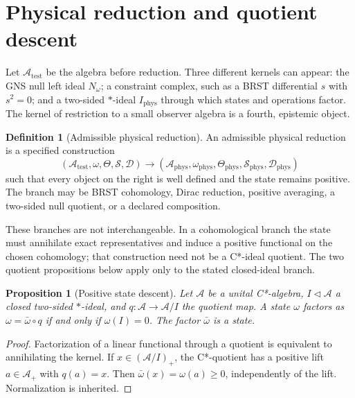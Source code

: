 \documentclass[11pt,a4paper]{article}
\newtheorem{proposition}[theorem]{Proposition}
\theoremstyle{definition}
\newtheorem{definition}[theorem]{Definition}
\theoremstyle{remark}
\newcommand{\A}{\mathcal A}
\newcommand{\Iphys}{I_{\mathrm{phys}}}
\newcommand{\Nw}{N_{\omega}}
\begin{document}
\section{Physical reduction and quotient descent}

Let $\A_{\mathrm{test}}$ be the algebra before reduction.  Three different
kernels can appear: the GNS null left ideal $\Nw$; a constraint complex, such
as a BRST differential $s$ with $s^2=0$; and a two-sided $*$-ideal $\Iphys$
through which states and operations factor.  The kernel of restriction to a
small observer algebra is a fourth, epistemic object.

\begin{definition}[Admissible physical reduction]
An admissible physical reduction is a specified construction
\begin{equation}
   (\A_{\mathrm{test}},\omega,\Theta,\mathcal S,\mathcal D)
   \longrightarrow
   (\A_{\mathrm{phys}},\omega_{\mathrm{phys}},
     \Theta_{\mathrm{phys}},\mathcal S_{\mathrm{phys}},
     \mathcal D_{\mathrm{phys}})
   \label{eq:physical-reduction}
\end{equation}
such that every object on the right is well defined and the state remains
positive.  The branch may be BRST cohomology, Dirac reduction, positive
averaging, a two-sided null quotient, or a declared composition.
\end{definition}

These branches are not interchangeable.  In a cohomological branch the state
must annihilate exact representatives and induce a positive functional on the
chosen cohomology; that construction need not be a C*-ideal quotient.  The two
quotient propositions below apply only to the stated closed-ideal branch.

\begin{proposition}[Positive state descent]
Let $\A$ be a unital C*-algebra, $I\triangleleft\A$ a closed two-sided
$*$-ideal, and $q:\A\to\A/I$ the quotient map.  A state $\omega$ factors as
$\omega=\bar\omega\circ q$ if and only if $\omega(I)=0$.  The factor
$\bar\omega$ is a state.
\end{proposition}

\begin{proof}
Factorization of a linear functional through a quotient is equivalent to
annihilating the kernel.  If $x\in(\A/I)_+$, the C*-quotient has a positive
lift $a\in\A_+$ with $q(a)=x$.  Then
$\bar\omega(x)=\omega(a)\ge0$, independently of the lift.  Normalization is
inherited.
\end{proof}
\end{document}

